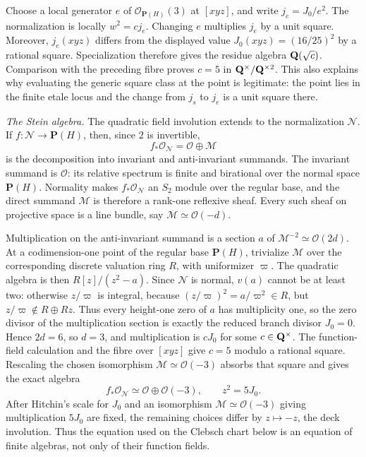 Choose a local generator \(e\) of
\(\mathcal O_{\mathbf P(H)}(3)\) at \([xyz]\), and write
\(j_e=J_0/e^2\).  The normalization is locally
\(w^2=cj_e\).  Changing \(e\) multiplies \(j_e\) by a unit square.
Moreover, \(j_e(xyz)\) differs from the displayed value
\(J_0(xyz)=(16/25)^2\) by a rational square.  Specialization therefore
gives the residue algebra \(\mathbf Q(\sqrt c)\).  Comparison with the preceding
fibre proves
\(c=5\) in \(\mathbf Q^\times/\mathbf Q^{\times2}\).  This also explains why evaluating
the generic square class at the point is legitimate: the point lies in the
finite etale locus and the change from \(j_s\) to \(j_e\) is a unit square
there.

\emph{The Stein algebra.}
The quadratic field involution extends to the normalization \(\mathcal N\).
If \(f:\mathcal N\to\mathbf P(H)\), then, since \(2\) is invertible,
\[
 f_*\mathcal O_{\mathcal N}=\mathcal O\oplus\mathcal M
\]
is the decomposition into invariant and anti-invariant summands.  The
invariant summand is \(\mathcal O\): its relative spectrum is finite and
birational over the normal space \(\mathbf P(H)\).  Normality makes
\(f_*\mathcal O_{\mathcal N}\) an \(S_2\) module over the regular base, and
the direct summand \(\mathcal M\) is therefore a rank-one reflexive sheaf.
Every such sheaf on projective space is a line bundle, say
\(\mathcal M\simeq\mathcal O(-d)\).

Multiplication on the anti-invariant summand is a section \(a\) of
\(\mathcal M^{-2}\simeq\mathcal O(2d)\).  At a codimension-one point of the
regular base \(\mathbf P(H)\), trivialize \(\mathcal M\) over the
corresponding discrete valuation ring \(R\), with uniformizer \(\varpi\).
The quadratic algebra is then \(R[z]/(z^2-a)\).  Since \(\mathcal N\) is
normal, \(v(a)\) cannot be at least two: otherwise \(z/\varpi\) is integral,
because \((z/\varpi)^2=a/\varpi^2\in R\), but
\(z/\varpi\notin R\oplus Rz\).  Thus every height-one zero of \(a\) has
multiplicity one, so the zero divisor of the multiplication section is
exactly the reduced branch divisor \(J_0=0\).  Hence \(2d=6\), so \(d=3\),
and multiplication is \(cJ_0\) for some \(c\in\mathbf Q^\times\).
The function-field calculation and
the fibre over \([xyz]\) give \(c=5\) modulo a rational square.  Rescaling the chosen
isomorphism \(\mathcal M\simeq\mathcal O(-3)\) absorbs that square and gives
the exact algebra
\[
 f_*\mathcal O_{\mathcal N}
 \simeq\mathcal O\oplus\mathcal O(-3),
 \qquad z^2=5J_0.
\]
After Hitchin's scale for \(J_0\) and an isomorphism
\(\mathcal M\simeq\mathcal O(-3)\) giving multiplication \(5J_0\) are
fixed, the remaining choices differ by \(z\mapsto-z\), the deck involution.
Thus the equation used on the Clebsch chart below is an equation of finite
algebras, not only of their function fields.

